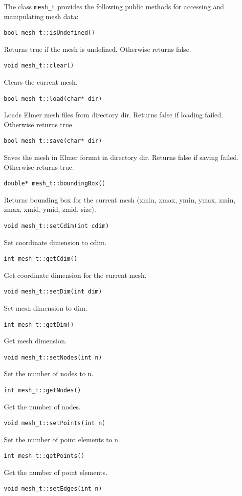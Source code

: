 \documentclass[a4paper,12pt]{article}
\begin{document}
The class {\tt mesh\_t} provides the following public methods for accessing
and manipulating mesh data:
\begin{verbatim}
bool mesh_t::isUndefined()
\end{verbatim}
Returns true if the mesh is undefined. Otherwise returns false.
\begin{verbatim}
void mesh_t::clear()
\end{verbatim}
Clears the current mesh.
\begin{verbatim} 
bool mesh_t::load(char* dir)
\end{verbatim}
Loads Elmer mesh files from directory dir. Returns false if loading failed. Otherwise returns true.
\begin{verbatim} 
bool mesh_t::save(char* dir)
\end{verbatim}
Saves the mesh in Elmer format in directory dir. Returns false if saving failed. Otherwise returns true.
\begin{verbatim} 
double* mesh_t::boundingBox()
\end{verbatim}
Returns bounding box for the current mesh (xmin, xmax, ymin, ymax, zmin, zmax, xmid, ymid, zmid, size).
\begin{verbatim} 
void mesh_t::setCdim(int cdim)
\end{verbatim}
Set coordinate dimension to cdim.
\begin{verbatim}  
int mesh_t::getCdim()
\end{verbatim}
Get coordinate dimension for the current mesh.
\begin{verbatim}  
void mesh_t::setDim(int dim)
\end{verbatim}
Set mesh dimension to dim.
\begin{verbatim}
int mesh_t::getDim()
\end{verbatim}
Get mesh dimension.
\begin{verbatim}  
void mesh_t::setNodes(int n)
\end{verbatim}
Set the number of nodes to n.
\begin{verbatim} 
int mesh_t::getNodes()
\end{verbatim}
Get the number of nodes.
\begin{verbatim} 
void mesh_t::setPoints(int n)
\end{verbatim}
Set the number of point elements to n.
\begin{verbatim} 
int mesh_t::getPoints()
\end{verbatim}
Get the number of point elements.
\begin{verbatim} 
void mesh_t::setEdges(int n)
\end{verbatim}
\end{document}
